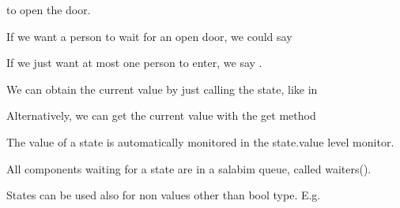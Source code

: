 \documentclass[letterpaper,10pt,english]{sphinxmanual}
\begin{document}
%
\begin{sphinxVerbatim}[commandchars=\\\{\}]
\end{sphinxVerbatim}

to open the door.

If we want a person to wait for an open door, we could say

%
\begin{sphinxVerbatim}[commandchars=\\\{\}]
 
\end{sphinxVerbatim}

If we just want at most one person to enter, we say .

We can obtain the current value by just calling the state, like in

%
\begin{sphinxVerbatim}[commandchars=\\\{\}]
    
\end{sphinxVerbatim}

Alternatively, we can get the current value with the get method

%
\begin{sphinxVerbatim}[commandchars=\\\{\}]
    
\end{sphinxVerbatim}

The value of a state is automatically monitored in the state.value level monitor.

All components waiting for a state are in a salabim queue, called waiters().

States can be used also for non values other than bool type. E.g.
\end{document}
